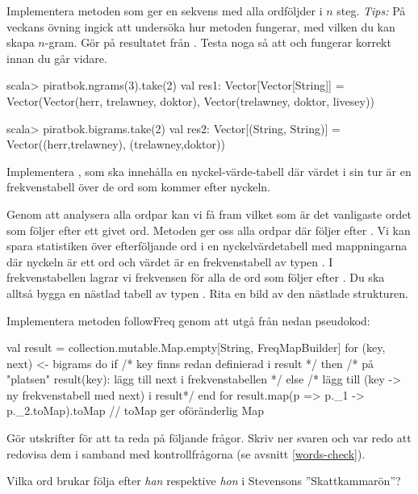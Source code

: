 \Task Implementera metoden  som ger en sekvens med alla ordföljder i $n$ steg. \emph{Tips:} På veckans övning ingick att undersöka hur metoden  fungerar, med vilken du kan skapa $n$-gram. Gör  på resultatet från . Testa noga så att  och  fungerar korrekt innan du går vidare.
\begin{REPL}
scala> piratbok.ngrams(3).take(2)
val res1: Vector[Vector[String]] =
  Vector(Vector(herr, trelawney, doktor), Vector(trelawney, doktor, livesey))

scala> piratbok.bigrams.take(2)
val res2: Vector[(String, String)] =
  Vector((herr,trelawney), (trelawney,doktor))
\end{REPL}

\Task Implementera , som ska innehålla en nyckel-värde-tabell där värdet i sin tur är en frekvenstabell över de ord som kommer efter nyckeln. \label{task-follow-freq}

Genom att analysera alla ordpar kan vi få fram vilket som är det vanligaste ordet som följer efter ett givet ord. Metoden  ger oss alla ordpar  där  följer efter . Vi kan spara statistiken över efterföljande ord i en nyckelvärdetabell med mappningarna  där nyckeln  är ett ord  och värdet  är en frekvenstabell av typen . I frekvenstabellen lagrar vi frekvensen för alla de ord som följer efter . Du ska alltså bygga en nästlad tabell av typen . Rita en bild av den nästlade strukturen.\Pen

Implementera metoden followFreq genom att utgå från nedan pseudokod:
\begin{Code}
val result = collection.mutable.Map.empty[String, FreqMapBuilder]
for (key, next) <- bigrams do
  if /* key finns redan definierad i result */ then
    /* på "platsen" result(key): lägg till next i frekvenstabellen */
  else
    /* lägg till (key -> ny frekvenstabell med next) i result*/
end for
result.map(p => p._1 -> p._2.toMap).toMap // toMap ger oföränderlig Map
\end{Code}
Gör utskrifter för att ta reda på följande frågor. Skriv ner svaren och var redo att redovisa dem i samband med kontrollfrågorna (se avsnitt \ref{words-check}).\Pen

\Subtask Vilka ord brukar följa efter \emph{han} respektive \emph{hon} i Stevensons ''Skattkammarön''?

